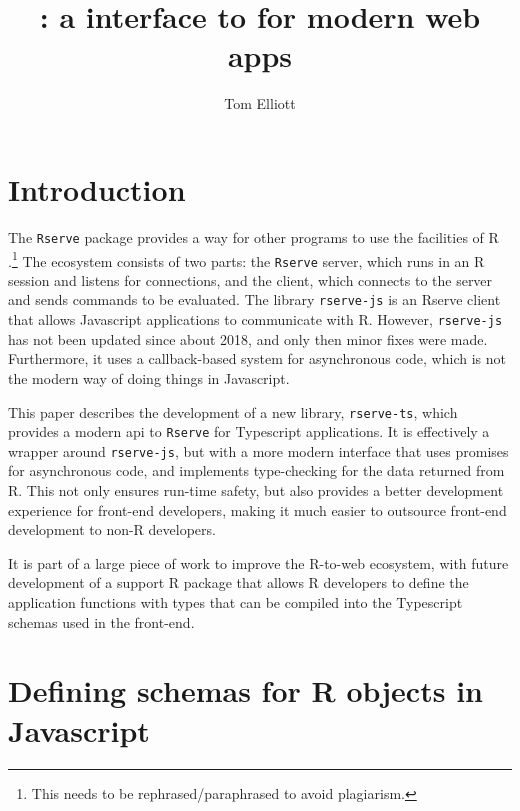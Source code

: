 \documentclass{article}
\title{\pkg{rserve-ts}: a \pkg{TypeScript} interface to \pkg{Rserve} for modern web apps}
\author{Tom Elliott}
\affil{iNZight Analytics Ltd}
\affil{University of Auckland}
\date{}
\newcommand{\pkg}[1]{\texttt{#1}}
\newcommand{\prog}[1]{{\sf #1}}
\newcommand{\R}{\prog{R}}
\begin{document}
\maketitle

\begin{abstract}

\end{abstract}

\section{Introduction}
\label{sec:intro}

The \pkg{Rserve} package \parencite{Urbanek2003} provides a way for other programs to use the facilities of \R{} \parencite{RCT2023}.\footnote{This needs to be rephrased/paraphrased to avoid plagiarism.}
The ecosystem consists of two parts: the \pkg{Rserve} server, which runs in an \R{} session and listens for connections, and the client, which connects to the server and sends commands to be evaluated.
The library \pkg{rserve-js} is an Rserve client that allows Javascript applications to communicate with \R{}.
However, \pkg{rserve-js} has not been updated since about 2018, and only then minor fixes were made.
Furthermore, it uses a callback-based system for asynchronous code, which is not the modern way of doing things in Javascript.

This paper describes the development of a new library, \pkg{rserve-ts}, which provides a modern \gls{api} to \pkg{Rserve} for Typescript applications.
It is effectively a wrapper around \pkg{rserve-js}, but with a more modern interface that uses promises for asynchronous code, and implements type-checking for the data returned from \R{}.
This not only ensures run-time safety, but also provides a better development experience for front-end developers, making it much easier to outsource front-end development to non-\R{} developers.

It is part of a large piece of work to improve the \R{}-to-web ecosystem, with future development of a support \R{} package that allows \R{} developers to define the application functions with types that can be compiled into the Typescript schemas used in the front-end.

\section{Defining schemas for \R{} objects in Javascript}
\label{sec:schemas}
\end{document}
